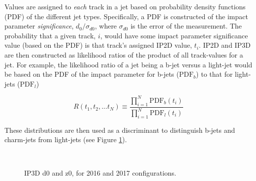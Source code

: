             Values are assigned to \textit{each} track in a jet based on probability density functions (PDF) of the different jet types.
            Specifically, a PDF is constructed of the impact parameter \textit{significance}, $d_0/\sigma_{d0}$,
                where $\sigma_{d0}$ is the error of the measurement.
            The probability that a given track, $i$, would have some impact parameter significance value (based on the PDF)
                is that track's assigned IP2D value, $t_i$.
            IP2D and IP3D are then constructed as likelihood ratios of the product of all track-values for a jet.
            For example, the likelihood ratio of a jet being a b-jet versus a light-jet would be based on
                the PDF of the impact parameter for b-jets ($\textrm{PDF}_b$) to that for light-jets ($\textrm{PDF}_l$)

            \begin{equation}
                R(t_1, t_2, ... t_N) \equiv \frac{\prod_{i=1}^N \textrm{PDF}_b(t_i)}{\prod_{i=1}^N \textrm{PDF}_l(t_i)}
            \end{equation}

            These distributions are then used as a discriminant to distinguish b-jets and charm-jets from light-jets
                (see Figure \ref{fig:ip3dsig})\cite{thesis_giacinto}. %

            \begin{figure}
                \\
                \caption{
                    IP3D d0 and z0, for 2016 and 2017 configurations\cite{btagging_optimisation}.
                }
                \label{fig:ip3dsig}
            \end{figure}


